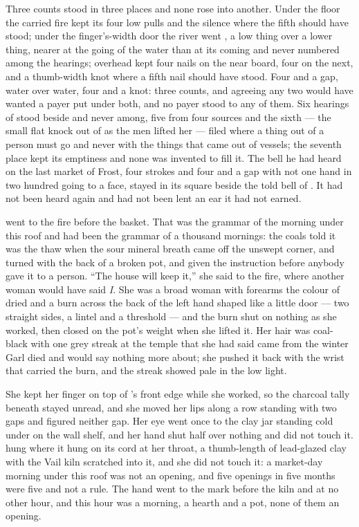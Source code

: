 Three counts stood in three places and none rose into another. Under the floor the carried fire kept its four low pulls and the silence where the fifth should have stood; under the finger's-width door the river went , a low thing over a lower thing, nearer at the going of the water than at its coming and never numbered among the hearings; overhead  kept four nails on the near board, four on the next, and a thumb-width knot where a fifth nail should have stood. Four and a gap, water over water, four and a knot: three counts, and agreeing any two would have wanted a payer put under both, and no payer stood to any of them. Six hearings of  stood beside and never among, five from four sources and the sixth --- the small flat knock out of  as the men lifted her --- filed where a thing out of a person must go and never with the things that came out of vessels; the seventh place kept its emptiness and none was invented to fill it. The bell he had heard on the last market of Frost, four strokes and four and a gap with not one hand in two hundred going to a face, stayed in its square beside the told bell of . It had not been heard again and had not been lent an ear it had not earned.

\scenebreak

 went to the fire before the basket. That was the grammar of the morning under this roof and had been the grammar of a thousand mornings: the coals told it was the thaw when the sour mineral breath came off the unswept corner, and turned with the back of a broken pot, and given the instruction before anybody gave it to a person. “The house will keep it,” she said to the fire, where another woman would have said \emph{I}. She was a broad woman with forearms the colour of dried  and a burn across the back of the left hand shaped like a little door --- two straight sides, a lintel and a threshold --- and the burn shut on nothing as she worked, then closed on the pot's weight when she lifted it. Her hair was coal-black with one grey streak at the temple that she had said came from the winter Garl died and would say nothing more about; she pushed it back with the wrist that carried the burn, and the streak showed pale in the low light.

She kept her finger on top of 's front edge while she worked, so the charcoal tally beneath stayed unread, and she moved her lips along a row standing with two gaps and figured neither gap. Her eye went once to the clay jar standing cold under  on the wall shelf, and her hand shut half over nothing and did not touch it.  hung where it hung on its cord at her throat, a thumb-length of lead-glazed clay with the Vail kiln scratched into it, and she did not touch it: a market-day morning under this roof was not an opening, and five openings in five months were five and not a rule. The hand went to the mark before the kiln and at no other hour, and this hour was a morning, a hearth and a pot, none of them an opening.

